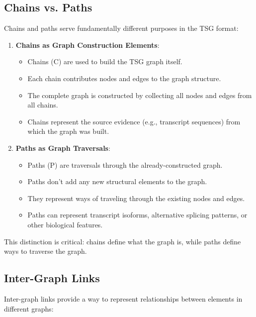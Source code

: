\documentclass{article}
\begin{document}
\subsection{Chains vs. Paths}

Chains and paths serve fundamentally different purposes in the TSG format:

\begin{enumerate}
	\item \textbf{Chains as Graph Construction Elements}:
	      \begin{itemize}
		      \item Chains (C) are used to build the TSG graph itself.
		      \item Each chain contributes nodes and edges to the graph structure.
		      \item The complete graph is constructed by collecting all nodes and edges from all chains.
		      \item Chains represent the source evidence (e.g., transcript sequences) from which the graph was built.
	      \end{itemize}

	\item \textbf{Paths as Graph Traversals}:
	      \begin{itemize}
		      \item Paths (P) are traversals through the already-constructed graph.
		      \item Paths don't add any new structural elements to the graph.
		      \item They represent ways of traveling through the existing nodes and edges.
		      \item Paths can represent transcript isoforms, alternative splicing patterns, or other biological features.
	      \end{itemize}
\end{enumerate}

This distinction is critical: chains define what the graph is, while paths define ways to traverse the graph.

\subsection{Inter-Graph Links}

Inter-graph links provide a way to represent relationships between elements in different graphs:
\end{document}
